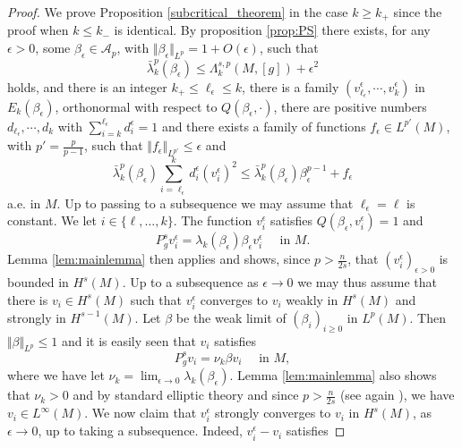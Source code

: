 \documentclass[10pt]{amsart}
\numberwithin{equation}{section}
\def\ep{{\varepsilon}}
\def \ep{\epsilon}
\theoremstyle{plain}
\theoremstyle{remark}
\begin{document}
\begin{proof}
We prove Proposition \ref{subcritical_theorem} in the case $k \ge k_+$ since the proof when $k \le k_{-}$ is identical. By proposition \ref{prop:PS} there exists, for any $\epsilon >0$, some $\beta_\epsilon \in \mathcal{A}_{p}$, with $\Vert \beta_\epsilon \Vert_{L^p} = 1 + O(\epsilon)$, such that  
\begin{equation} \label{eq:vp:souscrit:1}
\bar{ \lambda}_k^p(\beta_{\epsilon}) \leq  \Lambda_k^{s,p}(M,[g]) + \epsilon^2 
 \end{equation}
holds, and there is an integer $k_+ \leq \ell_\epsilon \leq k$, there is a family $(v_{\ell_\epsilon}^\epsilon, \cdots, v_{k}^\epsilon) $ in $E_k(\beta_\epsilon)$, orthonormal with respect to $Q(\beta_\epsilon,\cdot)$, there are positive numbers $d_{\ell_\epsilon},\cdots, d_k$ with $\sum_{i=k}^{\ell_\epsilon} d_i^\epsilon = 1$ and there exists a family of functions $f_\epsilon \in L^{p'}(M)$, with $p' = \frac{p}{p-1}$, such that $ \Vert f_\epsilon \Vert_{L^{p'}} \leq \epsilon $ and
\begin{equation} \label{eq:vp:souscrit:2} 
\bar{\lambda}^p_k(\beta_\epsilon) \sum_{i=\ell_\epsilon}^k d_i^\epsilon \left(v_i^\epsilon\right)^2 \leq \bar{\lambda}^p_k(\beta_\epsilon)\beta_\epsilon^{p-1} + f_\epsilon 
 \end{equation}
 a.e. in $M$. Up to passing to a subsequence we may assume that $\ell_\epsilon = \ell$ is constant. We let $i \in \{\ell, \dots, k\}$. The function $v_i^\epsilon$ satisfies $Q(\beta_\epsilon, v_i^{\epsilon}) = 1$ and 
 $$ P_g^s v_i^{\epsilon} = \lambda_k(\beta_\epsilon) \beta_{\epsilon} v_i^{\epsilon} \quad \text{ in } M .$$
 Lemma \ref{lem:mainlemma} then applies and shows, since $p > \frac{n}{2s}$, that $(v_i^{\epsilon})_{\epsilon >0}$ is bounded in $H^s(M)$. Up to a subsequence as $\ep \to 0$ we may thus assume that there is $v_i \in H^s(M)$ such that $v_i^{\epsilon}$ converges to $v_i $ weakly in $H^s(M)$ and strongly in $H^{s-1}(M)$. Let $\beta$ be the weak limit of $(\beta_i)_{i \ge0}$ in $L^{p}(M)$. Then $\Vert \beta \Vert_{L^p} \le 1$ and it is easily seen that $v_i $ satisfies 
 $$ P_g^s v_i  =\nu_k \beta v_i \quad \text{ in } M ,$$
 where we have let $\nu_k = \lim_{\epsilon \to 0} \lambda_k (\beta_{\epsilon})$.  Lemma \ref{lem:mainlemma} also shows that $\nu_k >0$ and by standard elliptic theory and since $p > \frac{n}{2s}$ (see again \cite[Theorem 5]{Mazumdar1}), we have $v_i \in L^\infty(M)$. We now claim that $v_i^{\epsilon}$ strongly converges to $v_i$ in $H^s(M)$, as $\ep \to 0$, up to taking a subsequence. Indeed, $v_i^{\epsilon} - v_i$ satisfies

\end{proof}
\end{document}
